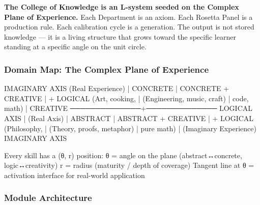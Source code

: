 \documentclass[11pt,letterpaper]{article}
\begin{document}
\begin{tealbox}
\textbf{The College of Knowledge is an L-system seeded on the Complex Plane of Experience.}
Each Department is an axiom. Each Rosetta Panel is a production rule. Each calibration cycle
is a generation. The output is not stored knowledge --- it is a living structure that grows
toward the specific learner standing at a specific angle on the unit circle.
\end{tealbox}

\subsubsection{Domain Map: The Complex Plane of Experience}

\begin{asciibox}
                    IMAGINARY AXIS
                   (Real Experience)
                          |
    CONCRETE              |              CONCRETE
    + CREATIVE           |             + LOGICAL
    (Art, cooking,       |           (Engineering,
     music, craft)      |            code, math)
                        |
CREATIVE  ──────────────+──────────────  LOGICAL
AXIS                    |              (Real Axis)
                        |
    ABSTRACT            |              ABSTRACT
    + CREATIVE          |             + LOGICAL
    (Philosophy,        |           (Theory, proofs,
     metaphor)         |            pure math)
                        |
                   (Imaginary Experience)
                   IMAGINARY AXIS

  Every skill has a (θ, r) position:
    θ = angle on the plane (abstract↔concrete, logic↔creativity)
    r = radius (maturity / depth of coverage)
    Tangent line at θ = activation interface for real-world application
\end{asciibox}

\subsubsection{Module Architecture}
\end{document}
